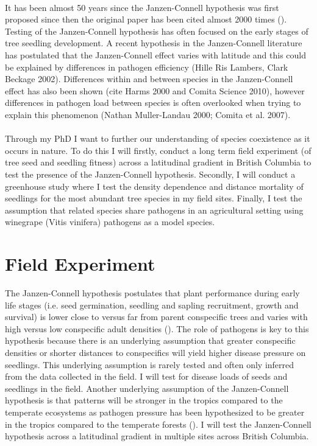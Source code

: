 \documentclass{article}
\begin{document}
\paragraph{}It has been almost 50 years since the Janzen-Connell hypothesis was first proposed since then the original paper has been cited almost 2000 times (\citep{Comita2014}). Testing of the Janzen-Connell hypothesis has often focused on the early stages of tree seedling development. A recent hypothesis in the Janzen-Connell literature has postulated that the Janzen-Connell effect varies with latitude and this could be explained by differences in pathogen efficiency (Hille Ris Lambers, Clark Beckage 2002). Differences within and between species in the Janzen-Connell effect has also been shown (cite Harms 2000 and Comita Science 2010), however differences in pathogen load between species is often overlooked when trying to explain this phenomenon (Nathan Muller-Landau 2000; Comita et al. 2007). 

\paragraph{}Through my PhD I want to further our understanding of species coexistence as it occurs in nature. To do this I will firstly, conduct a long term field experiment (of tree seed and seedling fitness) across a latitudinal gradient in British Columbia to test the presence of the Janzen-Connell hypothesis. Secondly, I will conduct a greenhouse study where I test the density dependence and distance mortality of seedlings for the most abundant tree species in my field sites. Finally, I test the assumption that related species share pathogens in an agricultural setting using winegrape (Vitis vinifera) pathogens as a model species. 

\section{Field Experiment}
The Janzen-Connell hypothesis postulates that plant performance during early life stages (i.e. seed germination, seedling and sapling recruitment, growth and survival) is lower close to versus far from parent conspecific trees and varies with high versus low conspecific adult densities (\citep{Comita2014}). The role of pathogens is key to this hypothesis because there is an underlying assumption that greater conspecific densities or shorter distances to conspecifics will yield higher disease pressure on seedlings. This underlying assumption is rarely tested and often only inferred from the data collected in the field. I will test for disease loads of seeds and seedlings in the field. Another underlying assumption of the Janzen-Connell hypothesis is that patterns will be stronger in the tropics compared to the temperate ecosystems as pathogen pressure has been hypothesized to be greater in the tropics compared to the temperate forests (\citep{Comita2014}). I will test the Janzen-Connell hypothesis across a latitudinal gradient in multiple sites across British Columbia. 
\end{document}
